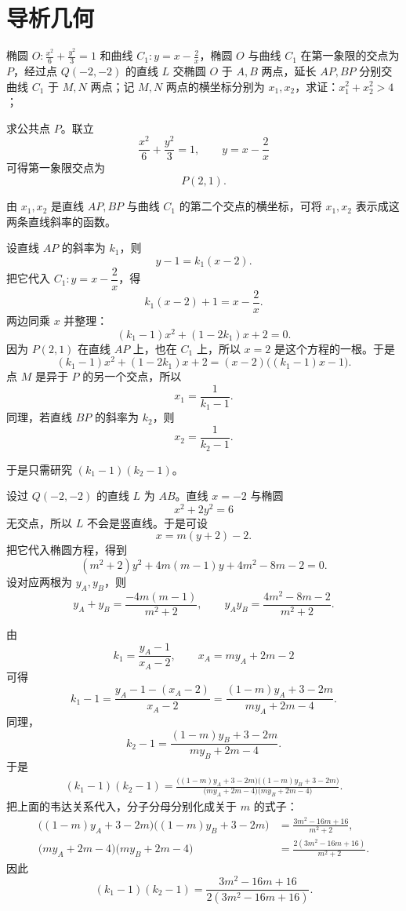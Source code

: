 \chapter{导析几何}

\begin{example}
椭圆 $O: \frac{x^2}{6} + \frac{y^2}{3} = 1$ 和曲线 $C_1: y = x - \frac{2}{x}$，椭圆 $O$ 与曲线 $C_1$ 在第一象限的交点为 $P$，经过点 $Q(-2,-2)$ 的直线 $L$ 交椭圆 $O$ 于 $A,B$ 两点，延长 $AP,BP$ 分别交曲线 $C_1$ 于 $M,N$ 两点；记 $M,N$ 两点的横坐标分别为 $x_1,x_2$，求证：$x_1^2 + x_2^2 > 4$；
\end{example}
\begin{solution}
求公共点 $P$。联立
\[
\frac{x^2}{6}+\frac{y^2}{3}=1,\qquad y=x-\frac{2}{x}
\]
可得第一象限交点为
\[
P(2,1).
\]

由 $x_1,x_2$ 是直线 $AP,BP$ 与曲线 $C_1$ 的第二个交点的横坐标，可将 $x_1,x_2$ 表示成这两条直线斜率的函数。

设直线 $AP$ 的斜率为 $k_1$，则
\[
y-1=k_1(x-2).
\]
把它代入 $C_1: y=x-\dfrac{2}{x}$，得
\[
k_1(x-2)+1=x-\frac{2}{x}.
\]
两边同乘 $x$ 并整理：
\[
(k_1-1)x^2+(1-2k_1)x+2=0.
\]
因为 $P(2,1)$ 在直线 $AP$ 上，也在 $C_1$ 上，所以 $x=2$ 是这个方程的一根。于是
\[
(k_1-1)x^2+(1-2k_1)x+2=(x-2)\bigl((k_1-1)x-1\bigr).
\]
点 $M$ 是异于 $P$ 的另一个交点，所以
\[
x_1=\frac{1}{k_1-1}.
\]
同理，若直线 $BP$ 的斜率为 $k_2$，则
\[
x_2=\frac{1}{k_2-1}.
\]

于是只需研究 $(k_1-1)(k_2-1)$。

设过 $Q(-2,-2)$ 的直线 $L$ 为 $AB$。直线 $x=-2$ 与椭圆
\[
x^2+2y^2=6
\]
无交点，所以 $L$ 不会是竖直线。于是可设
\[
x=m(y+2)-2.
\]
把它代入椭圆方程，得到
\[
(m^2+2)y^2+4m(m-1)y+4m^2-8m-2=0.
\]
设对应两根为 $y_A,y_B$，则
\[
y_A+y_B=\frac{-4m(m-1)}{m^2+2},\qquad
y_Ay_B=\frac{4m^2-8m-2}{m^2+2}.
\]

由
\[
k_1=\frac{y_A-1}{x_A-2},\qquad x_A=my_A+2m-2
\]
可得
\[
k_1-1=\frac{y_A-1-(x_A-2)}{x_A-2}
=\frac{(1-m)y_A+3-2m}{my_A+2m-4}.
\]
同理，
\[
k_2-1=\frac{(1-m)y_B+3-2m}{my_B+2m-4}.
\]
于是
\begin{align*}
(k_1-1)(k_2-1)
=\frac{\bigl((1-m)y_A+3-2m\bigr)\bigl((1-m)y_B+3-2m\bigr)}
{\bigl(my_A+2m-4\bigr)\bigl(my_B+2m-4\bigr)}.
\end{align*}
把上面的韦达关系代入，分子分母分别化成关于 $m$ 的式子：
\begin{align*}
\bigl((1-m)y_A+3-2m\bigr)\bigl((1-m)y_B+3-2m\bigr)
&=\frac{3m^2-16m+16}{m^2+2},\\
\bigl(my_A+2m-4\bigr)\bigl(my_B+2m-4\bigr)
&=\frac{2(3m^2-16m+16)}{m^2+2}.
\end{align*}
因此
\[
(k_1-1)(k_2-1)=\frac{3m^2-16m+16}{2(3m^2-16m+16)}.
\]


\end{solution}
